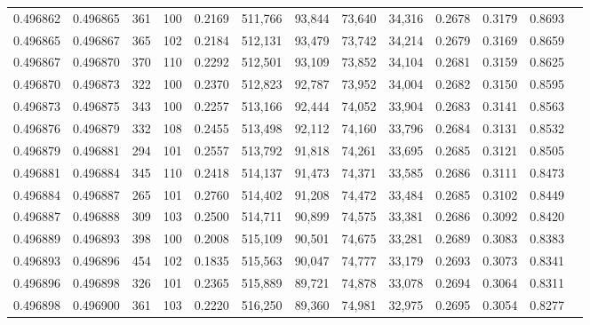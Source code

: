\begin{tabular}{rrrrrrrrrrrrr}
0.496862 & 0.496865 &   361 & 100 &                                     0.2169 & 511,766 &  93,844 &  73,640 &  34,316 & 0.2678 & 0.3179 & 0.8693 \\
0.496865 & 0.496867 &   365 & 102 &                                     0.2184 & 512,131 &  93,479 &  73,742 &  34,214 & 0.2679 & 0.3169 & 0.8659 \\
0.496867 & 0.496870 &   370 & 110 &                                     0.2292 & 512,501 &  93,109 &  73,852 &  34,104 & 0.2681 & 0.3159 & 0.8625 \\
0.496870 & 0.496873 &   322 & 100 &                                     0.2370 & 512,823 &  92,787 &  73,952 &  34,004 & 0.2682 & 0.3150 & 0.8595 \\
0.496873 & 0.496875 &   343 & 100 &                                     0.2257 & 513,166 &  92,444 &  74,052 &  33,904 & 0.2683 & 0.3141 & 0.8563 \\
0.496876 & 0.496879 &   332 & 108 &                                     0.2455 & 513,498 &  92,112 &  74,160 &  33,796 & 0.2684 & 0.3131 & 0.8532 \\
0.496879 & 0.496881 &   294 & 101 &                                     0.2557 & 513,792 &  91,818 &  74,261 &  33,695 & 0.2685 & 0.3121 & 0.8505 \\
0.496881 & 0.496884 &   345 & 110 &                                     0.2418 & 514,137 &  91,473 &  74,371 &  33,585 & 0.2686 & 0.3111 & 0.8473 \\
0.496884 & 0.496887 &   265 & 101 &                                     0.2760 & 514,402 &  91,208 &  74,472 &  33,484 & 0.2685 & 0.3102 & 0.8449 \\
0.496887 & 0.496888 &   309 & 103 &                                     0.2500 & 514,711 &  90,899 &  74,575 &  33,381 & 0.2686 & 0.3092 & 0.8420 \\
0.496889 & 0.496893 &   398 & 100 &                                     0.2008 & 515,109 &  90,501 &  74,675 &  33,281 & 0.2689 & 0.3083 & 0.8383 \\
0.496893 & 0.496896 &   454 & 102 &                                     0.1835 & 515,563 &  90,047 &  74,777 &  33,179 & 0.2693 & 0.3073 & 0.8341 \\
0.496896 & 0.496898 &   326 & 101 &                                     0.2365 & 515,889 &  89,721 &  74,878 &  33,078 & 0.2694 & 0.3064 & 0.8311 \\
0.496898 & 0.496900 &   361 & 103 &                                     0.2220 & 516,250 &  89,360 &  74,981 &  32,975 & 0.2695 & 0.3054 & 0.8277 \\

\end{tabular}
